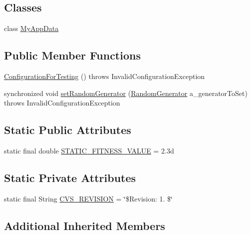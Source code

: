 \subsection*{Classes}
\begin{DoxyCompactItemize}
\item 
class \hyperlink{classorg_1_1jgap_1_1_configuration_for_testing_1_1_my_app_data}{My\-App\-Data}
\end{DoxyCompactItemize}
\subsection*{Public Member Functions}
\begin{DoxyCompactItemize}
\item 
\hyperlink{classorg_1_1jgap_1_1_configuration_for_testing_a3961613b202a5c21e97e6b493c967a5c}{Configuration\-For\-Testing} ()  throws Invalid\-Configuration\-Exception 
\item 
synchronized void \hyperlink{classorg_1_1jgap_1_1_configuration_for_testing_a0efec0fa2e03bb0fc5af4423e34290d2}{set\-Random\-Generator} (\hyperlink{interfaceorg_1_1jgap_1_1_random_generator}{Random\-Generator} a\-\_\-generator\-To\-Set)  throws Invalid\-Configuration\-Exception 
\end{DoxyCompactItemize}
\subsection*{Static Public Attributes}
\begin{DoxyCompactItemize}
\item 
static final double \hyperlink{classorg_1_1jgap_1_1_configuration_for_testing_a69f5e27bab8d766f102ab0ddee23d1d9}{S\-T\-A\-T\-I\-C\-\_\-\-F\-I\-T\-N\-E\-S\-S\-\_\-\-V\-A\-L\-U\-E} = 2.\-3d
\end{DoxyCompactItemize}
\subsection*{Static Private Attributes}
\begin{DoxyCompactItemize}
\item 
static final String \hyperlink{classorg_1_1jgap_1_1_configuration_for_testing_a1b1e44449b7b2644893e6c220e122f5e}{C\-V\-S\-\_\-\-R\-E\-V\-I\-S\-I\-O\-N} = \char`\"{}\$Revision\-: 1. \$\char`\"{}
\end{DoxyCompactItemize}
\subsection*{Additional Inherited Members}


